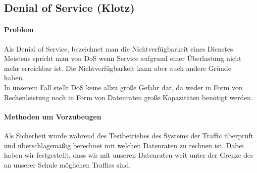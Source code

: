 \subsection{Denial of Service (Klotz)}
\paragraph{Problem\\}
Als Denial of Service, bezeichnet man die Nichtverfügbarkeit eines Dienstes. Meistens spricht man von DoS wenn Service aufgrund einer Überlastung nicht mehr erreichbar ist. Die Nichtverfügbarkeit kann aber auch andere Gründe haben.\\
In unserem Fall stellt DoS keine allzu große Gefahr dar, da weder in Form von Rechenleistung noch in Form von Datenraten große Kapazitäten benötigt werden.\\

\paragraph{Methoden um Vorzubeugen\\}
Als Sicherheit wurde während des Testbetriebes des Systems der Traffic überprüft und überschlagsmäßig berechnet mit welchen Datenraten zu rechnen ist. Dabei haben wir festgestellt, dass wir mit unseren Datenraten weit unter der Grenze des an unserer Schule möglichen Traffics sind.\\
